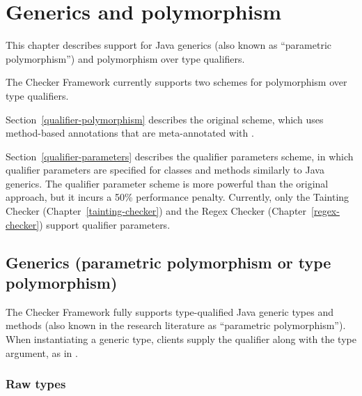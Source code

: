 \newcommand{\qp}[1]{\ensuremath{\langle\!\!\langle}#1\ensuremath{\rangle\!\!\rangle}}

\htmlhr
\chapter{Generics and polymorphism\label{polymorphism}}

This chapter describes support for Java generics (also known as
``parametric polymorphism'') and polymorphism over type qualifiers.

The Checker Framework currently supports two schemes for polymorphism over
type qualifiers.

Section~\ref{qualifier-polymorphism} describes the
original scheme, which uses method-based annotations that are meta-annotated
with .

Section~\ref{qualifier-parameters} describes the qualifier parameters
scheme, in which qualifier parameters are specified for classes and methods
similarly to Java generics.
The qualifier
parameter scheme is more powerful than the original approach, but
it incurs a
50\% performance penalty.
Currently, %
only the Tainting Checker
(Chapter~\ref{tainting-checker}) and the Regex Checker
(Chapter~\ref{regex-checker}) support qualifier parameters.


\section{Generics (parametric polymorphism or type polymorphism)\label{generics}}

The Checker Framework fully supports
type-qualified Java generic types and methods (also known in the research literature as ``parametric
polymorphism'').
When instantiating a generic type,
clients supply the qualifier along with the type argument, as in
.


\subsection{Raw types\label{generics-raw-types}}

